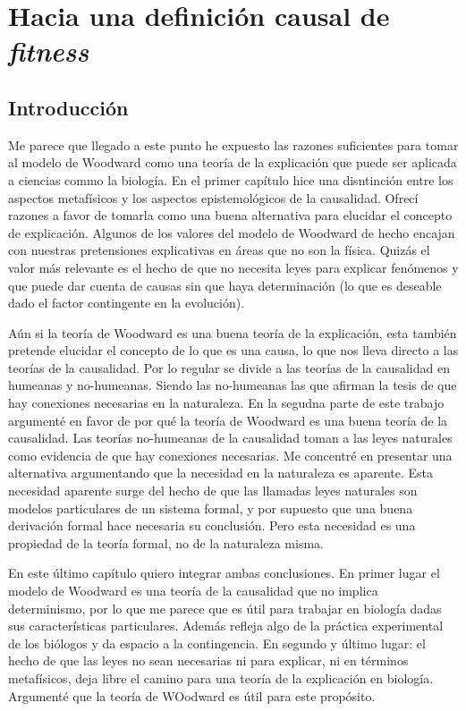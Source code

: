 \chapter{Hacia una definición causal de \emph{fitness}}

\section{Introducción}

Me parece que llegado a este punto he expuesto las razones suficientes para tomar al modelo de  Woodward como una teoría de la explicación que puede ser aplicada a ciencias commo la biología. En el primer capítulo hice una disntinción entre los aspectos metafísicos y los aspectos epistemológicos de la causalidad.  Ofrecí razones a  favor de tomarla como una buena alternativa para elucidar el concepto de explicación. Algunos de los valores del modelo de Woodward de hecho encajan con nuestras pretensiones explicativas en áreas que no son la física. Quizás el valor más relevante es el hecho de que no necesita leyes para explicar fenómenos y que puede dar cuenta de causas sin que haya determinación (lo que es deseable dado el factor contingente en la evolución).

Aún si la teoría de Woodward es una buena teoría de la explicación, esta también pretende elucidar el concepto de lo que es una causa, lo que nos lleva directo a las teorías de la causalidad. Por lo regular se divide a las teorías de la causalidad en humeanas y no-humeanas. Siendo las no-humeanas las que afirman la tesis de que hay conexiones necesarias en la naturaleza. En la segudna parte de este trabajo argumenté en favor de por qué la teoría de Woodward es una buena teoría de la causalidad. Las teorías no-humeanas de la causalidad toman a las leyes naturales como evidencia de que hay conexiones necesarias. Me concentré en presentar una alternativa argumentando que la necesidad en la naturaleza es aparente. Esta necesidad aparente surge del hecho de que las llamadas leyes naturales son modelos particulares de un sistema formal, y por supuesto que una buena derivación formal hace necesaria su conclusión. Pero esta necesidad es una propiedad de la teoría formal, no de la naturaleza misma.

En este último capítulo quiero integrar ambas conclusiones. En primer lugar el modelo de Woodward es una teoría de la causalidad que no implica determinismo, por lo que me parece que es útil para trabajar en biología dadas sus características particulares. Además refleja algo de la práctica experimental de los biólogos y da espacio a la contingencia. En segundo y último lugar: el hecho de que las leyes no sean necesarias ni para explicar, ni en términos metafísicos, deja libre el camino para una teoría de la explicación en biología. Argumenté que la teoría de WOodward es útil para este propósito.

